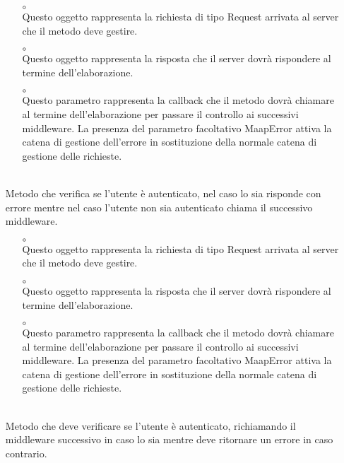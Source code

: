 \begin{itemize}
\begin{itemize}
\item[$\circ$]  \\ Questo oggetto rappresenta la richiesta di tipo Request arrivata al server che il metodo deve gestire.
\item[$\circ$]  \\ Questo oggetto rappresenta la risposta che il server dovrà rispondere al termine dell'elaborazione.
\item[$\circ$]  \\ Questo parametro rappresenta la callback che il metodo dovrà chiamare al termine dell'elaborazione per passare il controllo ai successivi middleware. La presenza del parametro facoltativo MaapError attiva la catena di gestione dell'errore in sostituzione della normale catena di gestione delle richieste.
\end{itemize}
\item[]  \\ Metodo che verifica se l'utente è autenticato, nel caso lo sia risponde con errore mentre nel caso l'utente non sia autenticato chiama il successivo middleware.
\begin{itemize}\addtolength{\itemsep}{-0.5\baselineskip}
\item[$\circ$]  \\ Questo oggetto rappresenta la richiesta di tipo Request arrivata al server che il metodo deve gestire.
\item[$\circ$]  \\ Questo oggetto rappresenta la risposta che il server dovrà rispondere al termine dell'elaborazione.
\item[$\circ$]  \\ Questo parametro rappresenta la callback che il metodo dovrà chiamare al termine dell'elaborazione per passare il controllo ai successivi middleware. La presenza del parametro facoltativo MaapError attiva la catena di gestione dell'errore in sostituzione della normale catena di gestione delle richieste.
\end{itemize}
\item[]  \\ Metodo che deve verificare se l'utente è autenticato, richiamando il middleware successivo in caso lo sia mentre deve ritornare un errore in caso contrario.

\end{itemize}

